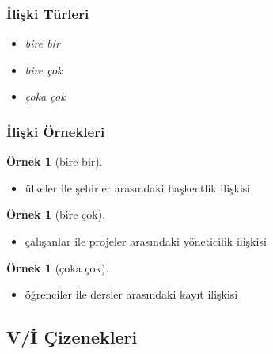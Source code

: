 \documentclass[dvipsnames]{beamer}
\theoremstyle{definition}
\theoremstyle{example}
\newtheorem{ornek}[theorem]{Örnek}
\theoremstyle{plain}
\begin{document}
\begin{frame}
  \frametitle{İlişki Türleri}

  \begin{itemize}
    \item \emph{bire bir}
    \item \emph{bire çok}
    \item \emph{çoka çok}
  \end{itemize}
\end{frame}

\begin{frame}
  \frametitle{İlişki Örnekleri}

  \begin{ornek}[bire bir]
    \begin{itemize}
      \item ülkeler ile şehirler arasındaki başkentlik ilişkisi
    \end{itemize}
  \end{ornek}

  \pause
  \begin{ornek}[bire çok]
    \begin{itemize}
      \item çalışanlar ile projeler arasındaki yöneticilik ilişkisi
    \end{itemize}
  \end{ornek}

  \pause
  \begin{ornek}[çoka çok]
    \begin{itemize}
      \item öğrenciler ile dersler arasındaki kayıt ilişkisi
    \end{itemize}
  \end{ornek}
\end{frame}

\subsection{V/İ Çizenekleri}
\end{document}
